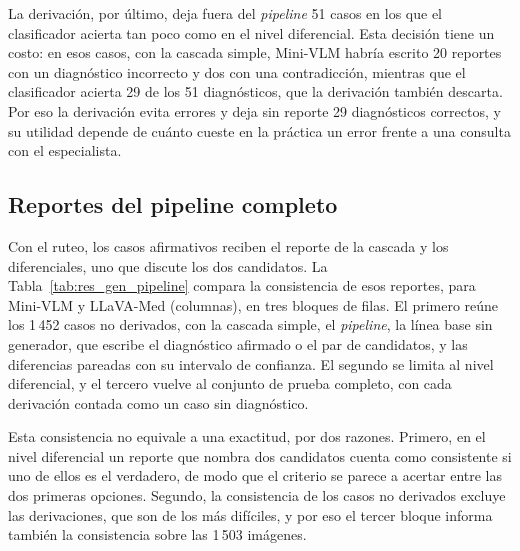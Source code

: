 La derivación, por último, deja fuera del \emph{pipeline} 51 casos en los que el clasificador acierta tan poco como en
el nivel diferencial. Esta decisión tiene un costo: en esos casos, con la cascada simple, Mini-VLM habría escrito 20
reportes con un diagnóstico incorrecto y dos con una contradicción, mientras que el clasificador acierta 29 de los 51
diagnósticos, que la derivación también descarta. Por eso la derivación evita errores y deja sin reporte 29 diagnósticos correctos, y su utilidad depende de cuánto cueste en la práctica un error frente a una consulta con el
especialista.

\subsection{Reportes del pipeline completo}
\label{sec:res_gen_pipeline}

Con el ruteo, los casos afirmativos reciben el reporte de la cascada y los diferenciales, uno que discute los dos
candidatos. La Tabla~\ref{tab:res_gen_pipeline} compara la consistencia de esos reportes, para Mini-VLM y LLaVA-Med
(columnas), en tres bloques de filas. El primero reúne los 1\,452 casos no derivados, con la cascada simple, el
\emph{pipeline}, la línea base sin generador, que escribe el diagnóstico afirmado o el par de candidatos, y las
diferencias pareadas con su intervalo de confianza. El segundo se limita al nivel diferencial, y el tercero vuelve al conjunto de prueba completo, con cada derivación contada como un caso sin diagnóstico.

Esta consistencia no equivale a una exactitud, por dos razones. Primero, en el nivel diferencial un reporte que nombra
dos candidatos cuenta como consistente si uno de ellos es el verdadero, de modo que el criterio se parece a acertar
entre las dos primeras opciones. Segundo, la consistencia de los casos no derivados excluye las derivaciones, que son
de los más difíciles, y por eso el tercer bloque informa también la consistencia sobre las 1\,503 imágenes.

